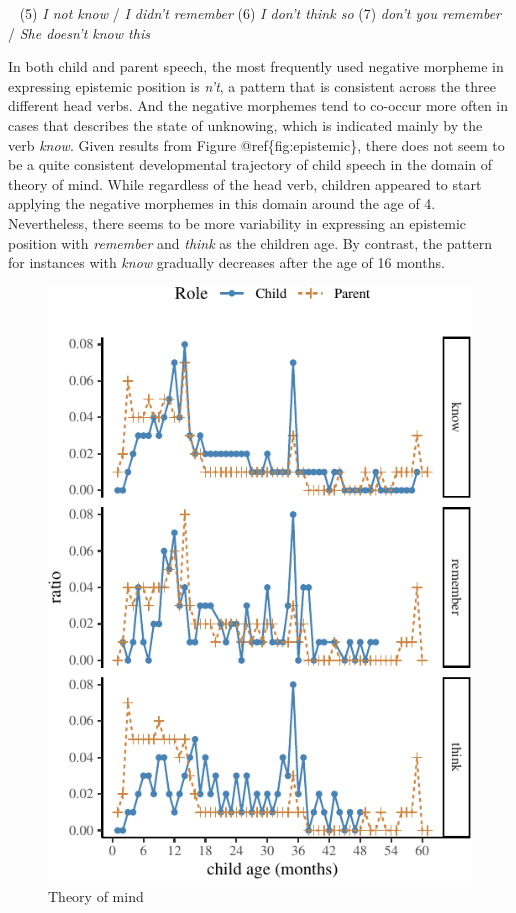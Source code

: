 \documentclass[10pt, letterpaper]{article}
\newenvironment{CodeChunk}{}{}
\begin{document}
~ (5) \emph{I not know} / \emph{I didn't remember} (6) \emph{I don't
think so} (7) \emph{don't you remember} / \emph{She doesn't know this} ~

In both child and parent speech, the most frequently used negative
morpheme in expressing epistemic position is \emph{n't}, a pattern that
is consistent across the three different head verbs. And the negative
morphemes tend to co-occur more often in cases that describes the state
of unknowing, which is indicated mainly by the verb \emph{know}. Given
results from Figure @ref\{fig:epistemic\}, there does not seem to be a
quite consistent developmental trajectory of child speech in the domain
of theory of mind. While regardless of the head verb, children appeared
to start applying the negative morphemes in this domain around the age
of 4. Nevertheless, there seems to be more variability in expressing an
epistemic position with \emph{remember} and \emph{think} as the children
age. By contrast, the pattern for instances with \emph{know} gradually
decreases after the age of 16 months.

\begin{CodeChunk}
\begin{figure}[H]

{\centering \includegraphics{figs/epistemic-1} 

}

\caption[Theory of mind]{Theory of mind}\label{fig:epistemic}
\end{figure}
\end{CodeChunk}
\end{document}
